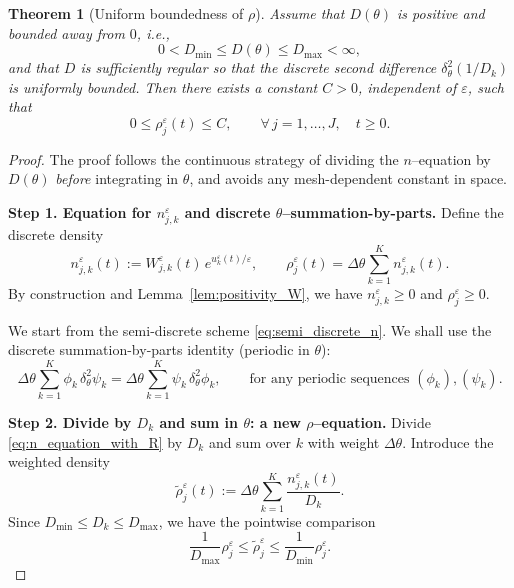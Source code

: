 \documentclass[11pt, dina4, amsfont12]{article}
\newtheorem{theorem}{Theorem}[section]
\begin{document}
\begin{theorem}[Uniform boundedness of $\rho$]\label{thm:rho_uniform_new}
Assume that $D(\theta)$ is positive and bounded away from $0$, i.e.,
\[
0<D_{\min}\le D(\theta)\le D_{\max}<\infty,
\]
and that $D$ is sufficiently regular so that the discrete second difference
$\delta_\theta^2(1/D_k)$ is uniformly bounded.
Then there exists a constant $C>0$, independent of $\varepsilon$, such that
\[
0 \le \rho_j^\varepsilon(t) \le C,
\qquad
\forall\, j=1,\dots,J,\quad t\ge0 .
\]
\end{theorem}

\begin{proof}
The proof follows the continuous strategy of dividing the $n$--equation by $D(\theta)$
\emph{before} integrating in $\theta$, and avoids any mesh-dependent constant in space.

\medskip
\noindent
\textbf{Step 1. Equation for $n_{j,k}^\varepsilon$ and discrete $\theta$--summation-by-parts.}
Define the discrete density
\[
n_{j,k}^\varepsilon(t):=W_{j,k}^\varepsilon(t)\,e^{u_k^\varepsilon(t)/\varepsilon},
\qquad
\rho_j^\varepsilon(t)=\Delta\theta\sum_{k=1}^K n_{j,k}^\varepsilon(t).
\]
By construction and Lemma~\ref{lem:positivity_W}, we have $n_{j,k}^\varepsilon\ge0$
and $\rho_j^\varepsilon\ge0$.

We start from the semi-discrete scheme \eqref{eq:semi_discrete_n}.
We shall use the discrete summation-by-parts identity (periodic in $\theta$):
\begin{equation}\label{eq:sbp_theta}
\Delta\theta\sum_{k=1}^K \phi_k\,\delta_\theta^2\psi_k
=
\Delta\theta\sum_{k=1}^K \psi_k\,\delta_\theta^2\phi_k,
\qquad
\text{for any periodic sequences }(\phi_k),(\psi_k).
\end{equation}

\medskip
\noindent
\textbf{Step 2. Divide by $D_k$ and sum in $\theta$: a new $\rho$--equation.}
Divide \eqref{eq:n_equation_with_R} by $D_k$ and sum over $k$ with weight $\Delta\theta$.
Introduce the weighted density
\[
\widetilde\rho_j^\varepsilon(t):=\Delta\theta\sum_{k=1}^K \frac{n_{j,k}^\varepsilon(t)}{D_k}.
\]
Since $D_{\min}\le D_k\le D_{\max}$, we have the pointwise comparison
\begin{equation}\label{eq:rho_tilde_compare}
\frac{1}{D_{\max}}\rho_j^\varepsilon
\le \widetilde\rho_j^\varepsilon
\le \frac{1}{D_{\min}}\rho_j^\varepsilon.
\end{equation}


\end{proof}
\end{document}
